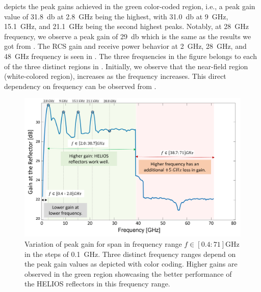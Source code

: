  depicts the peak gains achieved in the green color-coded region, i.e., a peak gain value of \SI{31.8}{\decibel} at \SI{2.8}{\giga\hertz} being the highest, with \SI{31.0}{\decibel} at \SI{9}{\giga\hertz}, \SI{15.1}{\giga\hertz}, and \SI{21.1}{\giga\hertz} being the second highest peaks. Notably, at \SI{28}{\giga\hertz} frequency, we observe a peak gain of \SI{29}{\decibel} which is the same as the results we got from . The RCS gain and receive power behavior at \SI{2}{\giga\hertz}, \SI{28}{\giga\hertz}, and \SI{48}{\giga\hertz} frequency is seen in . The three frequencies in the figure belongs to each of the three distinct regions in . Initially, we observe that the near-field region (white-colored region), increases as the frequency increases. This direct dependency on frequency can be observed from . 
\begin{figure}[H]
	\centering
	\includegraphics[width=0.9\linewidth]{images/Section 4 Images/Freq_vary_1}
	\caption{Variation of peak gain for span in frequency range $f\in [0.4:71] \si{\giga\hertz}$ in the steps of \SI{0.1}{\giga\hertz}. Three distinct frequency ranges depend on the peak gain values as depicted with color coding. Higher gains are observed in the green region showcasing the better performance of the HELIOS reflectors in this frequency range.}
	\label{fig:Freq_vary_1}
\end{figure}
